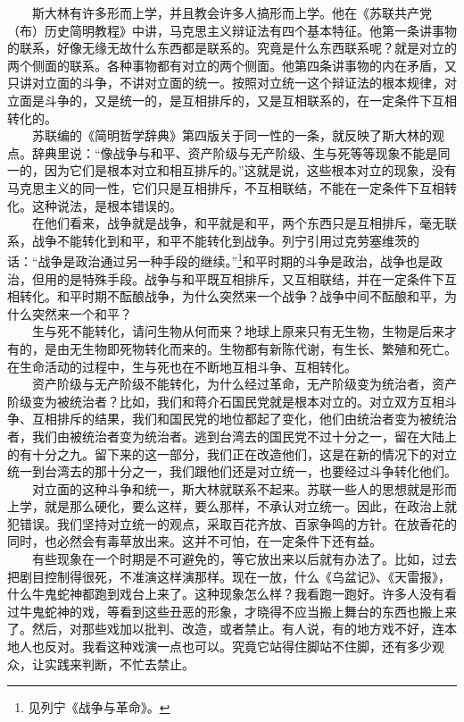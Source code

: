 \documentclass[cn,11pt,chinese]{elegantbook}
\begin{document}
　　斯大林有许多形而上学，并且教会许多人搞形而上学。他在《苏联共产党（布）历史简明教程》中讲，马克思主义辩证法有四个基本特征。他第一条讲事物的联系，好像无缘无故什么东西都是联系的。究竟是什么东西联系呢？就是对立的两个侧面的联系。各种事物都有对立的两个侧面。他第四条讲事物的内在矛盾，又只讲对立面的斗争，不讲对立面的统一。按照对立统一这个辩证法的根本规律，对立面是斗争的，又是统一的，是互相排斥的，又是互相联系的，在一定条件下互相转化的。\\
　　苏联编的《简明哲学辞典》第四版关于同一性的一条，就反映了斯大林的观点。辞典里说：“像战争与和平、资产阶级与无产阶级、生与死等等现象不能是同一的，因为它们是根本对立和相互排斥的。”这就是说，这些根本对立的现象，没有马克思主义的同一性，它们只是互相排斥，不互相联结，不能在一定条件下互相转化。这种说法，是根本错误的。\\
　　在他们看来，战争就是战争，和平就是和平，两个东西只是互相排斥，毫无联系，战争不能转化到和平，和平不能转化到战争。列宁引用过克劳塞维茨的话：“战争是政治通过另一种手段的继续。”\footnote[5]{ 见列宁《战争与革命》。}和平时期的斗争是政治，战争也是政治，但用的是特殊手段。战争与和平既互相排斥，又互相联结，并在一定条件下互相转化。和平时期不酝酿战争，为什么突然来一个战争？战争中间不酝酿和平，为什么突然来一个和平？\\
　　生与死不能转化，请问生物从何而来？地球上原来只有无生物，生物是后来才有的，是由无生物即死物转化而来的。生物都有新陈代谢，有生长、繁殖和死亡。在生命活动的过程中，生与死也在不断地互相斗争、互相转化。\\
　　资产阶级与无产阶级不能转化，为什么经过革命，无产阶级变为统治者，资产阶级变为被统治者？比如，我们和蒋介石国民党就是根本对立的。对立双方互相斗争、互相排斥的结果，我们和国民党的地位都起了变化，他们由统治者变为被统治者，我们由被统治者变为统治者。逃到台湾去的国民党不过十分之一，留在大陆上的有十分之九。留下来的这一部分，我们正在改造他们，这是在新的情况下的对立统一到台湾去的那十分之一，我们跟他们还是对立统一，也要经过斗争转化他们。\\
　　对立面的这种斗争和统一，斯大林就联系不起来。苏联一些人的思想就是形而上学，就是那么硬化，要么这样，要么那样，不承认对立统一。因此，在政治上就犯错误。我们坚持对立统一的观点，采取百花齐放、百家争鸣的方针。在放香花的同时，也必然会有毒草放出来。这并不可怕，在一定条件下还有益。\\
　　有些现象在一个时期是不可避免的，等它放出来以后就有办法了。比如，过去把剧目控制得很死，不准演这样演那样。现在一放，什么《乌盆记》、《天雷报》，什么牛鬼蛇神都跑到戏台上来了。这种现象怎么样？我看跑一跑好。许多人没有看过牛鬼蛇神的戏，等看到这些丑恶的形象，才晓得不应当搬上舞台的东西也搬上来了。然后，对那些戏加以批判、改造，或者禁止。有人说，有的地方戏不好，连本地人也反对。我看这种戏演一点也可以。究竟它站得住脚站不住脚，还有多少观众，让实践来判断，不忙去禁止。\\
\end{document}
